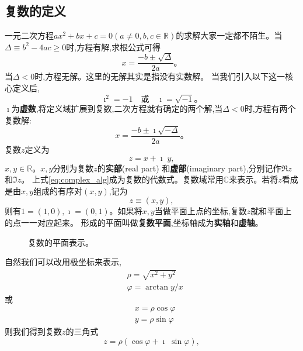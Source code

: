 


\subsection{复数的定义}
一元二次方程$a x^2 + b x + c = 0 (a\neq 0, b,c \in \mathbb{R})$的求解大家一定都不陌生。当$\Delta \equiv b^2 - 4 a c \geq 0$时,方程有解,求根公式可得
\begin{equation}
    x = \frac{-b \pm \sqrt{\Delta}}{2a} 。
\end{equation}
当$\Delta < 0$时,方程无解。这里的无解其实是指没有实数解。
当我们引入以下这一核心定义后,
\begin{equation}
    \imath ^2 = -1 \quad \textrm{或} \quad \imath = \sqrt{-1} 。 
\end{equation}
$\imath$为{\bf 虚数},将定义域扩展到复数,二次方程就有确定的两个解,当$\Delta < 0$时,方程有两个复数解:
\begin{equation}
    x = \frac{-b \pm \imath \sqrt{-\Delta}}{2a} 。
\end{equation}
复数$z$定义为
\begin{equation}
    \label{eq:complex_alg}
    z = x + \imath \; y ,
\end{equation}
$x,y \in {\mathbb{R}}$。$x,y$分别为复数$z$的{\bf 实部}(real part) 和{\bf 虚部}(imaginary part),分别记作$\Re z$和$\Im z$。
上式\eqref{eq:complex_alg}成为复数的代数式。复数域常用$\mathbb{C}$来表示。若将$z$看成是由$x,y$组成的有序对$(x,y)$,记为
\begin{equation}
    z \equiv (x,y),
\end{equation}
则有$1 = (1,0), \imath = (0, 1)$。如果将$x,y$当做平面上点的坐标,复数$z$就和平面上的点一一对应起来。
形成的平面叫做{\bf 复数平面},坐标轴成为{\bf 实轴}和{\bf 虚轴}。
\begin{figure}[htb]
    \centering
    
  \caption{复数的平面表示。} \label{fig:complex_plane}
\end{figure} 
自然我们可以改用极坐标来表示,
\begin{align}
    & \rho = \sqrt{x^2 + y^2}\\
    & \varphi = \arctan y/x
\end{align}
或
\begin{align}
    & x = \rho \cos\varphi \\
    & y = \rho \sin\varphi 
\end{align}
则我们得到复数$z$的三角式
\begin{equation}
    z = \rho (\cos\varphi +  \imath\; \sin\varphi) ,
\end{equation}
